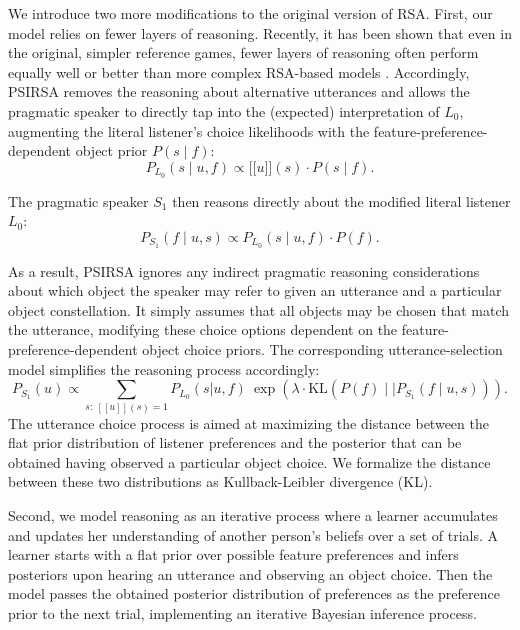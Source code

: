 \documentclass[10pt,a4paper]{article}
\newcommand{\sem}[1]{\mbox{$[\![$#1$]\!]$}}
\begin{document}
We introduce two more modifications to the original version of RSA. First, our model relies on fewer layers of reasoning. Recently, it has been shown that even in the original, simpler reference games, fewer layers of reasoning often perform equally well or better than more complex RSA-based models \cite{sikos2019}.
Accordingly, PSIRSA removes the reasoning about alternative utterances and allows the pragmatic speaker to directly tap into the (expected) interpretation of $L_0$, augmenting the literal listener's choice likelihoods with the feature-preference-dependent object prior $P(s\mid f)$:
\begin{equation}
P_{L_{0}}(s\mid u,f) \propto \sem{$u$}(s) \cdot P(s\mid f).
\end{equation}

The pragmatic speaker $S_{1}$ then reasons directly about the modified literal listener $L_{0}$: 
\begin{equation}
P_{S_{1}}(f\mid u,s) \propto P_{L_{0}}(s\mid u,f) \cdot P(f).
\end{equation}

As a result, PSIRSA ignores any indirect pragmatic reasoning considerations about which object the speaker may refer to given an utterance and a particular object constellation.
It simply assumes that all objects may be chosen that match the utterance, modifying these choice options dependent on the feature-preference-dependent object choice priors. The corresponding utterance-selection model simplifies the reasoning process accordingly:
\begin{equation}
P_{S_1}(u) \propto \sum_{s:\  [\![u]\!](s)=1} P_{L_0}(s|u,f)\ \exp(\lambda \cdot \textrm{KL}(P(f)\mid\mid P_{S_{1}}(f\mid u,s))).
\label{eq:kldivlambdasimp}
\end{equation}
The utterance choice process is aimed at maximizing the distance between the flat prior distribution of listener preferences and the posterior that can be obtained having observed a particular object choice. We formalize the distance between these two distributions as Kullback-Leibler divergence (KL).

Second, we model reasoning as an iterative process where a learner accumulates and updates her understanding of another person's beliefs over a set of trials. A learner starts with a flat prior over possible feature preferences and infers posteriors upon hearing an utterance and observing an object choice. Then the model passes the obtained posterior distribution of preferences as the preference prior to the next trial, implementing an iterative Bayesian inference process.
\end{document}
